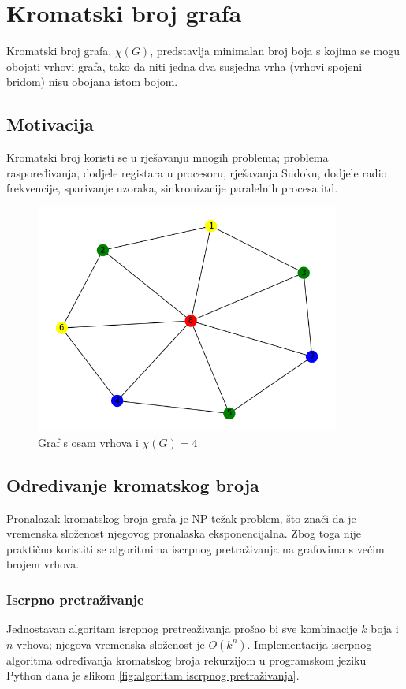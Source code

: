 \documentclass[times, utf8, zavrsni]{fer}
\begin{document}
\chapter{Kromatski broj grafa}
Kromatski broj grafa, $\chi(G)$, predstavlja minimalan broj boja s kojima se mogu obojati vrhovi grafa, tako da niti jedna dva susjedna vrha (vrhovi spojeni bridom) nisu obojana istom bojom. 

\section{Motivacija}
Kromatski broj koristi se u rješavanju mnogih problema; problema raspoređivanja, dodjele registara u procesoru, rješavanja Sudoku, dodjele radio frekvencije, sparivanje uzoraka, sinkronizacije paralelnih procesa itd. 

\begin{figure}[htb]
\centering
\includegraphics[width=10cm]{images/8_vertices_example.png}
\caption{Graf s osam vrhova i $\chi(G)=4$}
\label{fig:graf s obojanim vrhovima}
\end{figure}

\section{Određivanje kromatskog broja}
Pronalazak kromatskog broja grafa je NP-težak problem, što znači da je vremenska složenost njegovog pronalaska eksponencijalna. Zbog toga nije praktično koristiti se algoritmima iscrpnog pretraživanja na grafovima s većim brojem vrhova.

\subsection{Iscrpno pretraživanje}
Jednostavan algoritam isrcpnog pretreaživanja prošao bi sve kombinacije $k$ boja i $n$ vrhova; njegova vremenska složenost je $O(k^n)$. Implementacija iscrpnog algoritma određivanja kromatskog broja rekurzijom u programskom jeziku Python dana je slikom \ref{fig:algoritam iscrpnog pretraživanja}.
\end{document}
